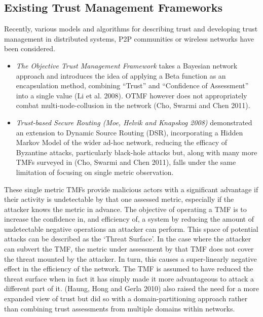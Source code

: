 \documentclass[runningheads,a4paper]{llncs}
\begin{document}
\subsection{Existing Trust Management Frameworks}

Recently, various models and algorithms for describing trust and developing trust management in distributed systems, P2P communities or wireless networks have been considered.

\begin{itemize}
  \item \emph{The Objective Trust Management Framework} takes a Bayesian network approach and introduces the idea of applying a Beta function as an encapsulation method, combining ``Trust'' and ``Confidence of Assessment'' into a single value (Li et al. 2008). OTMF however does not appropriately combat multi-node-collusion in the network (Cho, Swarmi and Chen 2011). 

  \item \emph{Trust-based Secure Routing (Moe, Helvik and Knapskog 2008)} demonstrated an extension to Dynamic Source Routing (DSR), incorporating a Hidden Markov Model of the wider ad-hoc network, reducing the efficacy of Byzantine attacks, particularly black-hole attacks but, along with many more TMFs surveyed in (Cho, Swarmi and Chen 2011), falls under the same limitation of focusing on single metric observation. 
\end{itemize}

These single metric TMFs provide malicious actors with a significant advantage if their activity is undetectable by that one assessed metric, especially if the attacker knows the metric in advance. 
The objective of operating a TMF is to increase the confidence in, and efficiency of, a system by reducing the amount of undetectable negative operations an attacker can perform. 
This space of potential attacks can be described as the ‘Threat Surface’. 
In the case where the attacker can subvert the TMF, the metric under assessment by that TMF does not cover the threat mounted by the attacker. 
In turn, this causes a super-linearly negative effect in the efficiency of the network. 
The TMF is assumed to have reduced the threat surface when in fact it has simply made it more advantageous to attack a different part of it.  
(Haung, Hong and Gerla 2010) also raised the need for a more expanded view of trust but did so with a domain-partitioning approach rather than combining trust assessments from multiple domains within networks. 
\end{document}
